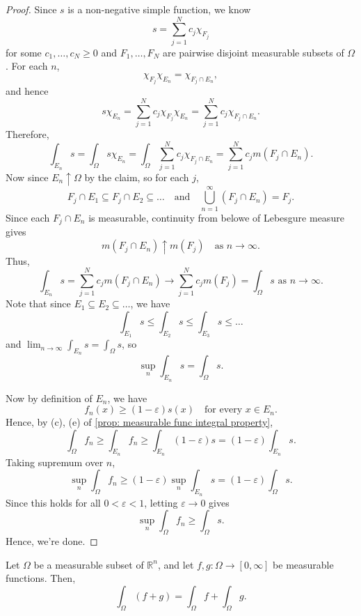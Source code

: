 \begin{proof}
    Since \(s\) is a non-negative simple function, we know 
    \[
        s = \sum_{j=1}^N c_j \chi _{F_j} 
    \] 
    for some \(c_1, \dots , c_N \ge 0\) and \(F_1, \dots , F_N\) are pairwise disjoint measurable subsets of \(\Omega\). For each \(n\), 
    \[
        \chi _{F_j} \chi _{E_n} = \chi _{F_j \cap E_n},
    \]    
    and hence 
    \[
        s \chi _{E_n} = \sum_{j=1}^N c_j \chi _{F_j} \chi _{E_n} = \sum_{j=1}^N c_j \chi _{F_j \cap E_n}.  
    \]
    Therefore,
    \[
        \int _{E_n} s = \int _\Omega s \chi _{E_n} = \int _\Omega \sum_{j=1}^N c_j \chi _{F_j \cap E_n} = \sum_{j=1}^N c_j m(F_j \cap E_n).  
    \]
    Now since \(E_n \uparrow \Omega\) by the claim, so for each \(j\),
    \[
        F_j \cap E_1 \subseteq F_j \cap E_2 \subseteq \dots \quad \text{and} \quad \bigcup_{n=1}^{\infty} (F_j \cap E_n) = F_j.  
    \]  
    Since each \(F_j \cap E_n\) is measurable, continuity from belowe of Lebesgure measure gives 
    \[
        m(F_j \cap E_n) \uparrow m(F_j) \quad \text{as } n \to \infty. 
    \] 
    Thus,
    \[
        \int _{E_n} s = \sum_{j=1}^N c_j m(F_j \cap E_n) \to \sum_{j=1}^N c_j m(F_j) = \int _\Omega s \text{ as } n \to \infty.
    \]
    Note that since \(E_1 \subseteq E_2 \subseteq \dots \), we have 
    \[
        \int _{E_1} s \le \int _{E_2} s \le \int _{E_3} s \le \dots  
    \] 
    and \(\lim_{n \to \infty} \int _{E_n} s = \int _\Omega s \), so 
    \[
        \sup _n \int _{E_n} s = \int _\Omega s.
    \] 

    Now by definition of \(E_n\), we have 
    \[
        f_n(x) \ge (1 - \varepsilon) s(x) \quad \text{for every } x \in E_n. 
    \]  
    Hence, by (c), (e) of \autoref{prop: measurable func integral property}, 
    \[
        \int _\Omega f_n \ge \int _{E_n} f_n \ge \int _{E_n} (1 - \varepsilon) s = (1 - \varepsilon) \int _{E_n} s.
    \] 
    Taking supremum over \(n\),
    \[
        \sup _n \int _\Omega f_n \ge (1 - \varepsilon) \sup _n \int_{E_n} s = (1 - \varepsilon) \int _\Omega s. 
    \] 
    Since this holds for all \(0 < \varepsilon < 1\), letting \(\varepsilon \to 0\) gives 
    \[
        \sup _n \int _\Omega f_n \ge \int _\Omega s.
    \]  
    Hence, we're done.
\end{proof}

\begin{lemma}
    Let \(\Omega \) be a measurable subset of \(\mathbb{R} ^n\), and let \(f, g: \Omega \to [0, \infty]\) be measurable functions. Then, 
    \[
        \int _\Omega (f + g) = \int _\Omega f + \int _\Omega g.
    \]   
\end{lemma}

